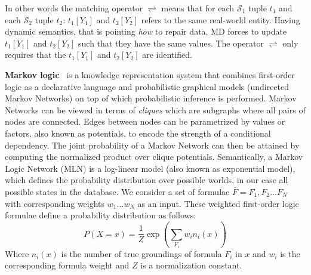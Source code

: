 In other words the matching operator $\rightleftharpoons$ means that for each $\mathcal{S}_1$ tuple $t_1$ and each $\mathcal{S}_2$ tuple $t_2$: $t_1[Y_1]$ and $t_2[Y_2]$ refers to the same real-world entity. Having dynamic semantics, that is pointing \textit{how} to repair data, MD forces to update $t_1[Y_1]$ and $t_2[Y_2]$ such that they have the same values. The operator $\rightleftharpoons$ only requires that the $t_1[Y_1]$ and $t_2[Y_2]$ are identified.


\textbf{Markov logic}~\cite{domingos2009markov} is a knowledge representation system that combines first-order logic as a declarative language and probabilistic graphical models (undirected Markov Networks) on top of which probabilistic inference is performed. Markov Networks can be viewed in terms of \emph{cliques} which are subgraphs where all pairs of nodes are connected. Edges between nodes can be parametrized by values or factors, also known as potentials, to encode the strength of a conditional dependency. The joint probability of a Markov Network can then be attained by computing the normalized product over clique potentials. 
Semantically, a Markov Logic Network (MLN) is a log-linear model (also known as exponential model), which defines the probability 
distribution over possible worlds, in our case all possible states in the database.%
We consider a set of formulae $\bar{F} = F_1, F_2 \dots F_N$ with corresponding weights $w_1 \dots w_N$ as an input. These weighted first-order logic formulae define a probability distribution as follows:
\begin{equation*}
P \left( X = x \right) = \frac{1}{Z} \exp\left( \sum_{F_i} w_i n_i \left( x \right) \right)
\end{equation*}
Where $n_i(x)$ is the number of true groundings of formula $F_i$ in $x$ and $w_i$ is the corresponding formula weight and $Z$ is a normalization constant.
